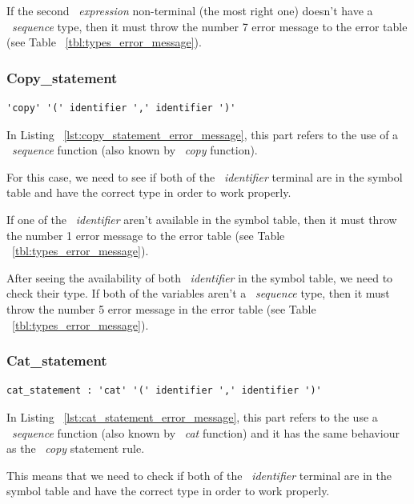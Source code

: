 \documentclass[
  oneside,
  11pt, a4paper,
  footinclude=true,
  headinclude=true,
  cleardoublepage=empty
]{scrbook}
\begin{document}
If the second ~\textit{expression} non-terminal (the most right one) doesn't have a ~\textit{sequence} type, then it must throw the number 7 error message to the error table (see Table ~\ref{tbl:types_error_message}).

\subsubsection{Copy\_statement}

\begin{lstlisting}[caption={Copy\_statement rule in LISS},label={lst:copy_statement_error_message}]
  'copy' '(' identifier ',' identifier ')'
\end{lstlisting}

In Listing ~\ref{lst:copy_statement_error_message}, this part refers to the use of a ~\textit{sequence} function (also known by ~\textit{copy} function).

For this case, we need to see if both of the ~\textit{identifier} terminal are in the symbol table and have the correct type in order to work properly.

If one of the ~\textit{identifier} aren't available in the symbol table, then it must throw the number 1 error message to the error table (see Table ~\ref{tbl:types_error_message}).

After seeing the availability of both ~\textit{identifier} in the symbol table, we need to check their type.
If both of the variables aren't a ~\textit{sequence} type, then it must throw the number 5 error message in the error table (see Table ~\ref{tbl:types_error_message}).

\subsubsection{Cat\_statement}

\begin{lstlisting}[caption={Cat\_statement rule in LISS},label={lst:cat_statement_error_message}]
  cat_statement : 'cat' '(' identifier ',' identifier ')'
\end{lstlisting}

In Listing ~\ref{lst:cat_statement_error_message}, this part refers to the use a ~\textit{sequence} function (also known by ~\textit{cat} function) and it has the same behaviour as the ~\textit{copy} statement rule. 

This means that we need to check if both of the ~\textit{identifier} terminal are in the symbol table and have the correct type in order to work properly.
\end{document}
